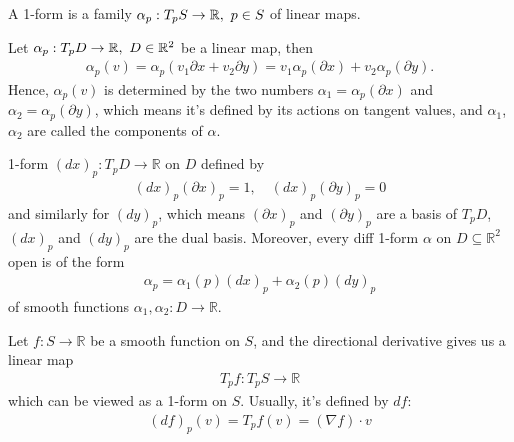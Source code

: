 \documentclass[10pt]{article}
\begin{document}
		\begin{definition}[1-form]
			A 1-form is a family $\alpha_p: T_pS\rightarrow\mathbb{R},\thinspace\thinspace p\in S$ of linear maps.
		\end{definition}
		Let $\alpha_p: T_pD\rightarrow\mathbb{R},\thinspace\thinspace D\in\mathbb{R}^2$ be a linear map, then
		\begin{equation*}
			\begin{aligned}
				\alpha_p(v) = \alpha_p(v_1\partial x + v_2\partial y) = v_1\alpha_p(\partial x) + v_2\alpha_p(\partial y).
			\end{aligned}
		\end{equation*}
		Hence, $\alpha_p(v)$ is determined by the two numbers $\alpha_1 = \alpha_p(\partial x)$ and $\alpha_2 = \alpha_p(\partial y)$, which means it's defined by its actions on tangent values, and $\alpha_1$, $\alpha_2$ are called the components of $\alpha$.

        \begin{definition}[1-form $(dx)_p$]
            1-form $(dx)_p: T_pD\rightarrow\mathbb{R}$ on $D$ defined by
            \begin{equation*}
                \begin{aligned}
                    (dx)_p(\partial x)_p = 1, \quad (dx)_p(\partial y)_p = 0
                \end{aligned}
            \end{equation*}
            and similarly for $(dy)_p$, which means $(\partial x)_p$ and $(\partial y)_p$ are a basis of $T_pD$, $(dx)_p$ and $(dy)_p$ are the dual basis. Moreover, every diff 1-form $\alpha$ on $D\subseteq\mathbb{R}^2$ open is of the form
            \begin{equation*}
                \begin{aligned}
                    \alpha_p = \alpha_1(p)(dx)_p + \alpha_2(p)(dy)_p
                \end{aligned}
            \end{equation*}
            of smooth functions $\alpha_1, \alpha_2: D\rightarrow\mathbb{R}$.
        \end{definition}
    
        \begin{proposition}[$T_pf$]
            Let $f: S\rightarrow\mathbb{R}$ be a smooth function on $S$, and the directional derivative gives us a linear map
            \begin{equation*}
                \begin{aligned}
                    T_pf: T_pS\rightarrow\mathbb{R}
                \end{aligned}
            \end{equation*}
            which can be viewed as a 1-form on $S$. Usually, it's defined by $df$:
            \begin{equation*}
                \begin{aligned}
                    (df)_p(v) = T_pf(v) = (\nabla f)\cdot v
                \end{aligned}
            \end{equation*}
        \end{proposition}
        
\end{document}
